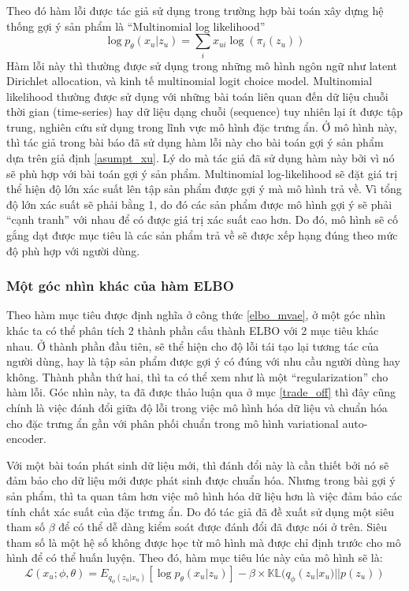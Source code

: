     Theo đó hàm lỗi được tác giả sử dụng trong trường hợp bài toán xây dựng hệ thống gợi ý sản phẩm là ``Multinomial log likelihood'' 
    \begin{equation}
        \log p_\theta(x_u|z_u) = \sum_i x_{ui}\log (\pi_i(z_u))
    \end{equation}
    Hàm lỗi này thì thường được sử dụng trong những mô hình ngôn ngữ như latent Dirichlet allocation, và kinh tế multinomial logit choice model. 
    Multinomial likelihood thường được sử dụng với những bài toán liên quan đến dữ liệu chuỗi thời gian (time-series) hay dữ liệu dạng chuỗi (sequence) tuy nhiên lại ít được tập trung, nghiên cứu sử dụng trong lĩnh vực mô hình đặc trưng ẩn. 
    Ở mô hình này, thì tác giả trong bài báo \cite{mvae} đã sử dụng hàm lỗi này cho bài toán gợi ý sản phẩm dựa trên giả định \ref{asumpt_xu}.
    Lý do mà tác giả đã sử dụng hàm này bởi vì nó sẽ phù hợp với bài toán gợi ý sản phẩm.
    Multinomial log-likelihood sẽ đặt giá trị thể hiện độ lớn xác suất lên tập sản phẩm được gợi ý mà mô hình trả về. 
    Vì tổng độ lớn xác suất sẽ phải bằng 1, do đó các sản phẩm được mô hình gợi ý sẽ phải ``cạnh tranh'' với nhau để có được giá trị xác suất cao hơn. 
    Do đó, mô hình sẽ cố gắng dạt được mục tiêu là các sản phẩm trả về sẽ được xếp hạng đúng theo mức độ phù hợp với người dùng. 
    
    \subsubsection{Một góc nhìn khác của hàm ELBO}
    Theo hàm mục tiêu được định nghĩa ở công thức \ref{elbo_mvae}, ở một góc nhìn khác ta có thể phân tích 2 thành phần cấu thành ELBO với 2 mục tiêu khác nhau.
    Ở thành phần đầu tiên, sẽ thể hiện cho độ lỗi tái tạo lại tương tác của người dùng, hay là tập sản phẩm được gợi ý có đúng với nhu cầu người dùng hay không. 
    Thành phần thứ hai, thì ta có thể xem như là một ``regularization'' cho hàm lỗi.
    Góc nhìn này, ta đã được thảo luận qua ở mục \ref{trade_off} thì đây cũng chính là việc đánh đổi giữa độ lỗi trong việc mô hình hóa dữ liệu và chuẩn hóa cho đặc trưng ẩn gần với phân phối chuẩn trong mô hình variational auto-encoder.

    Với một bài toán phát sinh dữ liệu mới, thì đánh đổi này là cần thiết bởi nó sẽ đảm bảo cho dữ liệu mới được phát sinh được chuẩn hóa.
    Nhưng trong bài gợi ý sản phẩm, thì ta quan tâm hơn việc mô hình hóa dữ liệu hơn là việc đảm bảo các tính chất xác suất của đặc trưng ẩn.
    Do đó tác giả đã đề xuất sử dụng một siêu tham số $\beta$ để có thể dễ dàng kiểm soát được đánh đổi đã được nói ở trên. 
    Siêu tham số là một hệ số không được học từ mô hình mà được chỉ định trước cho mô hình để có thể huấn luyện.
    Theo đó, hàm mục tiêu lúc này của mô hình sẽ là:
    \begin{equation}
        \label{elbo_betamvae}
        \mathcal{L}(x_u;\phi,\theta) = E_{q_\phi(z_u|x_u)}[\log p_\theta(x_u|z_u)] - \beta \times \mathbb{KL}(q_\phi(z_u|x_u) || p(z_u))
    \end{equation}

